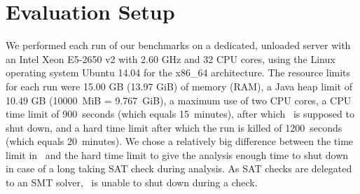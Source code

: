 \section{Evaluation Setup}
We performed each run of our benchmarks on a dedicated, unloaded server with an Intel Xeon E5-2650 v2 with 2.60 GHz and 32 CPU cores, using the Linux operating system Ubuntu 14.04 for the x86\_64 architecture.
The resource limits for each run were 15.00 GB (13.97 GiB) of memory (RAM), a Java heap limit of 10.49 GB (10000~MiB = 9.767~GiB),
a maximum use of two CPU cores,
a CPU time limit of 900~seconds (which equals 15~minutes), after which \cpaChecker\ is supposed to shut down,
and a hard time limit after which the run is killed of 1200~seconds (which equals 20~minutes).
We chose a relatively big difference between the time limit in \cpaChecker\ and the hard time limit to give the analysis enough time to shut down in case of a long taking SAT check during analysis.
As SAT checks are delegated to an SMT solver, \cpaChecker\ is unable to shut down during a check.

